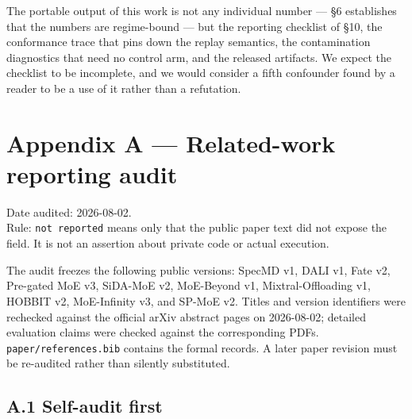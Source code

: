 \documentclass[
  10pt,
  letterpaper,
  10pt]{article}
\begin{document}
The portable output of this work is not any individual number --- §6
establishes that the numbers are regime-bound --- but the reporting
checklist of §10, the conformance trace that pins down the replay
semantics, the contamination diagnostics that need no control arm, and
the released artifacts. We expect the checklist to be incomplete, and we
would consider a fifth confounder found by a reader to be a use of it
rather than a refutation.

\section{Appendix A --- Related-work reporting
audit}\label{appendix-a-related-work-reporting-audit}

Date audited: 2026-08-02.\\
Rule: \texttt{not\ reported} means only that the public paper text did
not expose the field. It is not an assertion about private code or
actual execution.

The audit freezes the following public versions: SpecMD v1, DALI v1,
Fate v2, Pre-gated MoE v3, SiDA-MoE v2, MoE-Beyond v1,
Mixtral-Offloading v1, HOBBIT v2, MoE-Infinity v3, and SP-MoE v2. Titles
and version identifiers were rechecked against the official arXiv
abstract pages on 2026-08-02; detailed evaluation claims were checked
against the corresponding PDFs. \texttt{paper/references.bib} contains
the formal records. A later paper revision must be re-audited rather
than silently substituted.

\subsection{A.1 Self-audit first}\label{a.1-self-audit-first}
\end{document}
